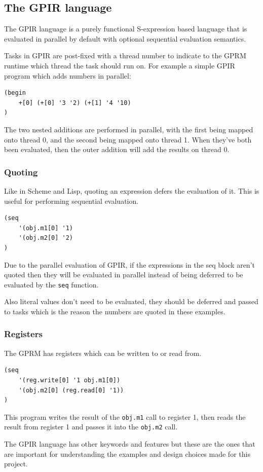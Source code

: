 \subsection{The GPIR language}

The GPIR language is a purely functional S-expression based language that is evaluated in parallel by default 
with optional sequential evaluation semantics.

Tasks in GPIR are post-fixed with a thread number to indicate to the GPRM runtime which thread
the task should run on. For example a simple GPIR program which adds numbers in parallel:

\begin{lstlisting}[style=myGPIR]
(begin
    +[0] (+[0] '3 '2) (+[1] '4 '10)
)
\end{lstlisting}

The two nested additions are performed in parallel, with the first being mapped onto thread 0,
and the second being mapped onto thread 1. When they've both been evaluated, then the outer addition
will add the results on thread 0.

\subsubsection{Quoting}

Like in Scheme and Lisp, quoting an expression defers the evaluation of it. 
This is useful for performing sequential evaluation.

\begin{lstlisting}[style=myGPIR]
(seq 
    '(obj.m1[0] '1)
    '(obj.m2[0] '2)
)
\end{lstlisting}

Due to the parallel evaluation of GPIR, if the expressions in the seq block aren't quoted then
they will be evaluated in parallel instead of being deferred to be evaluated by the \texttt{seq} function.

Also literal values don't need to be evaluated, they should be deferred and passed to tasks which is
the reason the numbers are quoted in these examples.

\subsubsection{Registers}

The GPRM has registers which can be written to or read from.

\begin{lstlisting}[style=myGPIR]
(seq
    '(reg.write[0] '1 obj.m1[0])
    '(obj.m2[0] (reg.read[0] '1))
)
\end{lstlisting}

This program writes the result of the \texttt{obj.m1} call to register 1,
then reads the result from register 1 and passes it into the \texttt{obj.m2} call.

The GPIR language has other keywords and features but these are the ones that are important for
understanding the examples and design choices made for this project.
